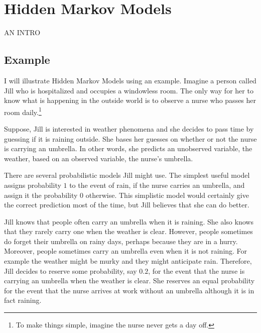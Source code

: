 \chapter{Hidden Markov Models}
\label{chapter:hmm}

AN INTRO

\section{Example}

I will illustrate Hidden Markov Models using an example. Imagine a
person called Jill who is hospitalized and occupies a windowless
room. The only way for her to know what is happening in the outside
world is to observe a nurse who passes her room daily.\footnote{To make things simple, imagine the nurse never gets a day
  off.}

Suppose, Jill is interested in weather phenomena and she decides to
pass time by guessing if it is raining outside. She bases her guesses
on whether or not the nurse is carrying an umbrella. In other words,
she predicts an unobserved variable, the weather, based on an observed
variable, the nurse's umbrella.

There are several probabilistic models Jill might use. The simplest
useful model assigns probability $1$ to the event of rain, if the
nurse carries an umbrella, and assign it the probability $0$
otherwise. This simplistic model would certainly give the correct
prediction most of the time, but Jill believes that she can do better.

Jill knows that people often carry an umbrella when it is raining. She
also knows that they rarely carry one when the weather is
clear. However, people sometimes do forget their umbrella on
rainy days, perhaps because they are in a hurry. Moreover, people
sometimes carry an umbrella even when it is not raining. For example
the weather might be murky and they might anticipate rain. Therefore,
Jill decides to reserve some probability, say $0.2$, for the event
that the nurse is carrying an umbrella when the weather is clear. She
reserves an equal probability for the event that the nurse arrives at
work without an umbrella although it is in fact raining.
 
